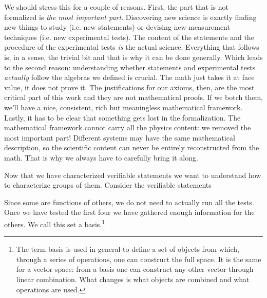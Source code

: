 \documentclass[11pt,letterpaper,fleqn]{memoir} %
\begin{document}
We should stress this for a couple of reasons. First, the part that is not formalized is \emph{the most important part}. Discovering new science is exactly finding new things to study (i.e. new statements) or devising new measurement techniques (i.e. new experimental tests). The content of the statements and the procedure of the experimental tests \emph{is} the actual science. Everything that follows is, in a sense, the trivial bit and that is why it can be done generally. Which leads to the second reason: understanding whether statements and experimental tests \emph{actually} follow the algebras we defined is crucial. The math just takes it at face value, it does not prove it. The justifications for our axioms, then, are the most critical part of this work and they are not mathematical proofs. If we botch them, we'll have a nice, consistent, rich but meaningless mathematical framework. Lastly, it has to be clear that something gets lost in the formalization. The mathematical framework cannot carry all the physics content: we removed the most important part! Different systems may have the same mathematical description, so the scientific content can never be entirely reconstructed from the math. That is why we always have to carefully bring it along.

Now that we have characterized verifiable statements we want to understand how to characterize groups of them. Consider the verifiable statements
\begin{description}
	\item {}
	\item {}
	\item {}
	\item {}
	\item {}
	\item {}
	\item {}
\end{description}
Since some are functions of others, we do not need to actually run all the tests. Once we have tested the first four we have gathered enough information for the others. We call this set a basis.\footnote{The term basis is used in general to define a set of objects from which, through a series of operations, one can construct the full space. It is the same for a vector space: from a basis one can construct any other vector through linear combination. What changes is what objects are combined and what operations are used.}
\end{document}
